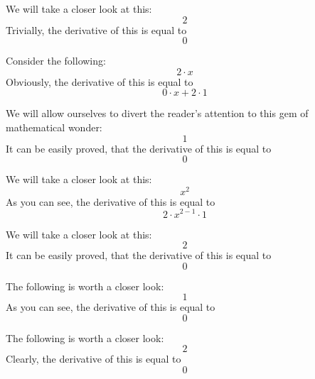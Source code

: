 \documentclass{article}
\begin{document}
We will take a closer look at this:
\begin{equation}
2 
\end{equation}
Trivially, the derivative of this is equal to
\begin{equation}
0 
\end{equation}

Consider the following:
\begin{equation}
2 \cdot x 
\end{equation}
Obviously, the derivative of this is equal to
\begin{equation}
0 \cdot x + 2 \cdot 1 
\end{equation}

We will allow ourselves to divert the reader's attention to this gem of mathematical wonder:
\begin{equation}
1 
\end{equation}
It can be easily proved, that the derivative of this is equal to
\begin{equation}
0 
\end{equation}

We will take a closer look at this:
\begin{equation}
x ^{2 } 
\end{equation}
As you can see, the derivative of this is equal to
\begin{equation}
2 \cdot x ^{2 - 1 } \cdot 1 
\end{equation}

We will take a closer look at this:
\begin{equation}
2 
\end{equation}
It can be easily proved, that the derivative of this is equal to
\begin{equation}
0 
\end{equation}

The following is worth a closer look:
\begin{equation}
1 
\end{equation}
As you can see, the derivative of this is equal to
\begin{equation}
0 
\end{equation}

The following is worth a closer look:
\begin{equation}
2 
\end{equation}
Clearly, the derivative of this is equal to
\begin{equation}
0 
\end{equation}
\end{document}
